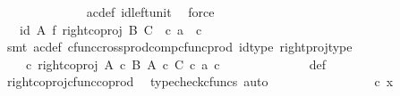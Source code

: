 \begin{isabellebody}
\ \ \ \ \ \ \ \ \ \ \ \ \isamarkupfalse%
\ ac{\isacharunderscore}{\kern0pt}def\ id{\isacharunderscore}{\kern0pt}left{\isacharunderscore}{\kern0pt}unit{}\ \isamarkupfalse%
\ force\isanewline
\ \ \ \ \ \ \ \ \ \ \isamarkupfalse%
\ \isamarkupfalse%
\ {\isachardoublequoteopen}{\isachardot}{\kern0pt}{\isachardot}{\kern0pt}{\isachardot}{\kern0pt}\ {\isacharequal}{\kern0pt}\ {\isacharparenleft}{\kern0pt}id\ A\ {\isasymtimes}\isactrlsub f\ right{\isacharunderscore}{\kern0pt}coproj\ B\ C{\isacharparenright}{\kern0pt}\ \ {\isasymcirc}\isactrlsub c\ {\isasymlangle}a{\isacharcomma}{\kern0pt}\ \ c{\isasymrangle}{\isachardoublequoteclose}\isanewline
\ \ \ \ \ \ \ \ \ \ \ \ \isamarkupfalse%
\ {\isacharparenleft}{\kern0pt}smt\ ac{\isacharunderscore}{\kern0pt}def\ cfunc{\isacharunderscore}{\kern0pt}cross{\isacharunderscore}{\kern0pt}prod{\isacharunderscore}{\kern0pt}comp{\isacharunderscore}{\kern0pt}cfunc{\isacharunderscore}{\kern0pt}prod\ id{\isacharunderscore}{\kern0pt}type\ right{\isacharunderscore}{\kern0pt}proj{\isacharunderscore}{\kern0pt}type{\isacharparenright}{\kern0pt}\isanewline
\ \ \ \ \ \ \ \ \ \ \isamarkupfalse%
\ \isamarkupfalse%
\ {\isachardoublequoteopen}{\isachardot}{\kern0pt}{\isachardot}{\kern0pt}{\isachardot}{\kern0pt}\ {\isacharequal}{\kern0pt}\ {\isacharparenleft}{\kern0pt}{\isasymphi}\ {\isasymcirc}\isactrlsub c\ right{\isacharunderscore}{\kern0pt}coproj\ {\isacharparenleft}{\kern0pt}A\ {\isasymtimes}\isactrlsub c\ B{\isacharparenright}{\kern0pt}\ {\isacharparenleft}{\kern0pt}A\ {\isasymtimes}\isactrlsub c\ C{\isacharparenright}{\kern0pt}{\isacharparenright}{\kern0pt}\ {\isasymcirc}\isactrlsub c\ {\isasymlangle}a{\isacharcomma}{\kern0pt}\ c{\isasymrangle}{\isachardoublequoteclose}\isanewline
\ \ \ \ \ \ \ \ \ \ \ \ \isamarkupfalse%
\ {\isasymphi}{\isacharunderscore}{\kern0pt}def\ \isamarkupfalse%
\ right{\isacharunderscore}{\kern0pt}coproj{\isacharunderscore}{\kern0pt}cfunc{\isacharunderscore}{\kern0pt}coprod\ \isamarkupfalse%
\ {\isacharparenleft}{\kern0pt}typecheck{\isacharunderscore}{\kern0pt}cfuncs{\isacharcomma}{\kern0pt}\ auto{\isacharparenright}{\kern0pt}\isanewline
\ \ \ \ \ \ \ \ \ \ \isamarkupfalse%
\ \isamarkupfalse%
\ {\isachardoublequoteopen}{\isachardot}{\kern0pt}{\isachardot}{\kern0pt}{\isachardot}{\kern0pt}\ {\isacharequal}{\kern0pt}\ {\isasymphi}\ {\isasymcirc}\isactrlsub c\ x{\isachardoublequoteclose}\isanewline
\ \ \ \ \ \ \ \ \ \ \ \ \isamarkupfalse%

\end{isabellebody}
